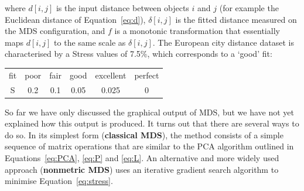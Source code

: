 \noindent where $d[i,j]$ is the input distance between objects $i$ and
$j$ (for example the Euclidean distance of Equation~\ref{eq:d}),
$\delta[i,j]$ is the fitted distance measured on the MDS
configuration, and $f$ is a monotonic transformation that essentially
maps $d[i,j]$ to the same scale as $\delta[i,j]$.  The European city
distance dataset is characterised by a Stress values of 7.5\%, which
corresponds to a `good' fit:

\begin{center}
  \begin{tabular}{c|ccccc}
    fit & poor & fair & good & excellent & perfect \\
    S & 0.2 & 0.1 & 0.05 & 0.025 & 0
  \end{tabular}
  \label{tab:S}
\end{center}

So far we have only discussed the graphical output of MDS, but we have
not yet explained how this output is produced. It turns out that there
are several ways to do so. In its simplest form (\textbf{classical
  MDS}), the method consists of a simple sequence of matrix operations
that are similar to the PCA algorithm outlined in
Equations~\ref{eq:PCA}, \ref{eq:P} and \ref{eq:L}. An alternative and
more widely used approach (\textbf{nonmetric MDS}) uses an iterative
gradient search algorithm to minimise
Equation~\ref{eq:stress}.\medskip

